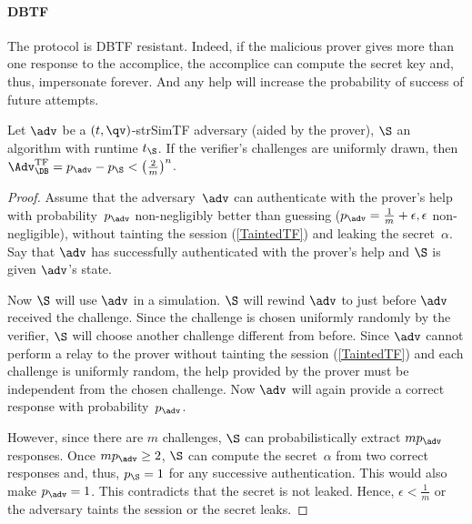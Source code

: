 \paragraph{\Acl{DBTF}}

The protocol is \ac{DBTF} resistant.
Indeed, if the malicious prover gives more than one response to the accomplice, 
the accomplice can compute the secret key and, thus, impersonate forever.
And any help will increase the probability of success of future attempts.

\begin{theorem}
  Let \(\adv\) be a \((t, \qv)\)-strSimTF adversary (aided by the prover), 
  \(\S\) an algorithm with runtime \(t_{\S}\).
  If the verifier's challenges are uniformly drawn, then 
  \(\Adv_{\DB}^{\text{TF}} = p_{\adv} - p_{\S} < \left(\frac{2}{m}\right)^n\).
\end{theorem}

\begin{proof}
  Assume that the adversary~\(\adv\) can authenticate with the prover's help 
  with probability~\(p_{\adv}\) non-negligibly better than guessing (\(p_{\adv} 
  = \frac{1}{m}+\epsilon, \epsilon\) non-negligible), without tainting the 
  session (\cref{TaintedTF}) and leaking the secret~\(\alpha\).
  Say that \(\adv\) has successfully authenticated with the prover's help and 
  \(\S\) is given \(\adv\)'s state.

  Now \(\S\) will use \(\adv\) in a simulation.
  \(\S\) will rewind \(\adv\) to just before \(\adv\) received the challenge.
  Since the challenge is chosen uniformly randomly by the verifier, \(\S\) will 
  choose another challenge different from before.
  Since \(\adv\) cannot perform a relay to the prover without tainting the 
  session (\cref{TaintedTF}) and each challenge is uniformly random, the help 
  provided by the prover must be independent from the chosen challenge.
  Now \(\adv\) will again provide a correct response with 
  probability~\(p_{\adv}\).

  However, since there are \(m\) challenges, \(\S\) can probabilistically extract 
  \(m p_{\adv}\) responses.
  Once \(m p_{\adv} \geq 2\), \(\S\) can compute the secret~\(\alpha\) from two 
  correct responses and, thus, \(p_{\S} = 1\) for any successive 
  authentication.
  This would also make \(p_{\adv} = 1\).
  This contradicts that the secret is not leaked.
  Hence, \(\epsilon < \frac{1}{m}\) or the adversary taints the session or the 
  secret leaks.
\end{proof}

